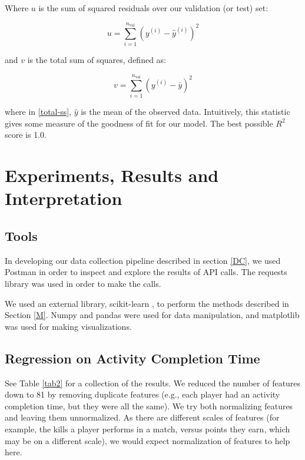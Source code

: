 \documentclass[conference]{IEEEtran}
\begin{document}
Where $u$ is the sum of squared residuals over our
validation (or test) set:

\begin{equation}
    u = \sum_{i = 1}^{n_\text{val}}
    (y^{(i)} - \hat{y}^{(i)})^2
\end{equation}

and $v$ is the total sum of squares, defined as:

\begin{equation}
    v = \sum_{i = 1}^{n_\text{val}}
    (y^{(i)} -
    \bar{y})^2\label{total-ss}
\end{equation}

where in \ref{total-ss}, $\hat{y}$ is the mean of the
observed data. Intuitively, this statistic gives some measure of the goodness
of fit for our model. The best possible $R^2$ score is 1.0.

\section{Experiments, Results and Interpretation}\label{RI}

\subsection{Tools}
In developing our data collection pipeline described in section
\ref{DC}, we used Postman \cite{postman} in order to
inspect and explore the results of API calls. The requests library was used in
order to make the calls.

We used an external library, scikit-learn \cite{sklearn}, to perform
the methods described in Section \ref{M}. Numpy and pandas were
used for data manipulation, and matplotlib was used for making visualizations.

\subsection{Regression on Activity Completion Time}

See Table \ref{tab2} for a collection of the results. We reduced
the number of features down to 81 by removing duplicate features (e.g., each
player had an activity completion time, but they were all the same). We try
both normalizing features and leaving them unnormalized. As there are different
scales of features (for example, the kills a player performs in a match, versus
points they earn, which may be on a different scale), we would expect
normalization of features to help here.
\end{document}

